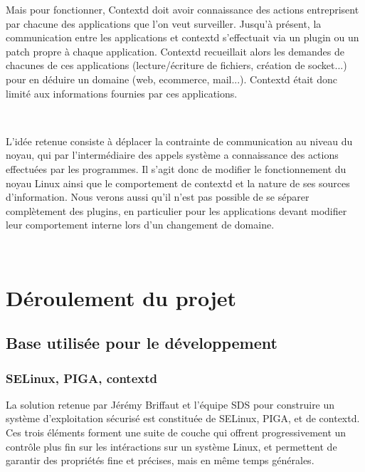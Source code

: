 \documentclass[pdftex,a4paper,titlepage,11pt]{article}
\begin{document}
Mais pour fonctionner, Contextd doit avoir connaissance des actions entreprisent par chacune des applications que l'on veut surveiller. Jusqu'à présent, la communication entre les applications et contextd s'effectuait via un plugin ou un patch propre à chaque application. Contextd recueillait alors les demandes de chacunes de ces applications (lecture/écriture de fichiers, création de socket...) pour en déduire un domaine (web, ecommerce, mail...). Contextd était donc limité aux informations fournies par ces applications.

~

L'idée retenue consiste à déplacer la contrainte de communication au niveau du noyau, qui par l'intermédiaire des appels système a connaissance des actions effectuées par les programmes. Il s'agit donc de modifier le fonctionnement du noyau Linux ainsi que le comportement de contextd et la nature de ses sources d'information. Nous verons aussi qu'il n'est pas possible de se séparer complètement des plugins, en particulier pour les applications devant modifier leur comportement interne lors d'un changement de domaine.

~

\newpage



\newpage

\section{Déroulement du projet}

\subsection{Base utilisée pour le développement}


\subsubsection{SELinux, PIGA, contextd}

La solution retenue par Jérémy Briffaut et l'équipe SDS pour construire un système d'exploitation sécurisé est constituée de SELinux, PIGA, et de contextd. Ces trois éléments forment une suite de couche qui offrent progressivement un contrôle plus fin sur les intéractions sur un système Linux, et permettent de garantir des propriétés fine et précises, mais en même temps générales.
\end{document}
